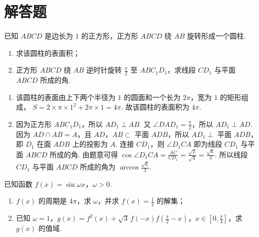 \section{解答题}

\begin{problem}
已知 \(ABCD\) 是边长为 \(1\) 的正方形，正方形 \(ABCD\) 绕 \(AB\) 旋转形成一个圆柱.

\begin{enumerate}
\item 求该圆柱的表面积；
\item 正方形 \(ABCD\) 绕 \(AB\) 逆时针旋转 \(\frac{\pi}{2}\) 至 \(ABC_1D_1\)，求线段 \(CD_1\) 与平面 \(ABCD\) 所成的角.
\end{enumerate}

\end{problem}

\begin{solution}
\begin{enumerate}
\item 该圆柱的表面由上下两个半径为 \(1\) 的圆面和一个长为 \(2\pi\)，宽为 \(1\) 的矩形组成，
\(S=2\times\pi\times1^2+2\pi\times1=4\pi\).
故该圆柱的表面积为 \(4\pi\).

\item 因为正方形 \(ABC_1D_1\)，所以 \(AD_1\perp AB\).
又 \(\angle DAD_1=\frac{\pi}{2}\)，所以 \(AD_1\perp AD\).
因为 \(AD\cap AB=A\)，且 \(AD\)，\(AB\subset\) 平面 \(ADB\)，所以 \(AD_1\perp\) 平面 \(ADB\)，即 \(D_1\) 在面 \(ADB\) 上的投影为 \(A\).
连接 \(CD_1\)，则 \(\angle D_1CA\) 即为线段 \(CD_1\) 与平面 \(ABCD\) 所成的角.
由题意可得
\(\cos\angle D_1CA=\frac{AC}{CD_1}=\frac{\sqrt2}{\sqrt3}=\frac{\sqrt6}{3}\).
所以线段 \(CD_1\) 与平面 \(ABCD\) 所成的角为
\(\arccos\frac{\sqrt6}{3}\).
\end{enumerate}
\end{solution}

\begin{problem}
已知函数 \(f(x)=\sin\omega x\)，\(\omega>0\).

\begin{enumerate}
\item \(f(x)\) 的周期是 \(4\pi\)，求 \(\omega\)，并求 \(f(x)=\frac12\) 的解集；
\item 已知 \(\omega=1\)，\(g(x)=f^2(x)+\sqrt3\,f(-x)f\!\left(\frac\pi2-x\right)\)，\(x\in\left[0,\frac\pi4\right]\)，求 \(g(x)\) 的值域.
\end{enumerate}
\end{problem}

